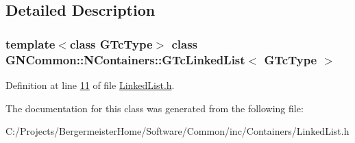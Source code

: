 \subsection{Detailed Description}
\subsubsection*{template$<$class G\+Tc\+Type$>$\newline
class G\+N\+Common\+::\+N\+Containers\+::\+G\+Tc\+Linked\+List$<$ G\+Tc\+Type $>$}



Definition at line \mbox{\hyperlink{_linked_list_8h_source_l00011}{11}} of file \mbox{\hyperlink{_linked_list_8h_source}{Linked\+List.\+h}}.



The documentation for this class was generated from the following file\+:\begin{DoxyCompactItemize}
\item 
C\+:/\+Projects/\+Bergermeister\+Home/\+Software/\+Common/inc/\+Containers/Linked\+List.\+h\end{DoxyCompactItemize}
